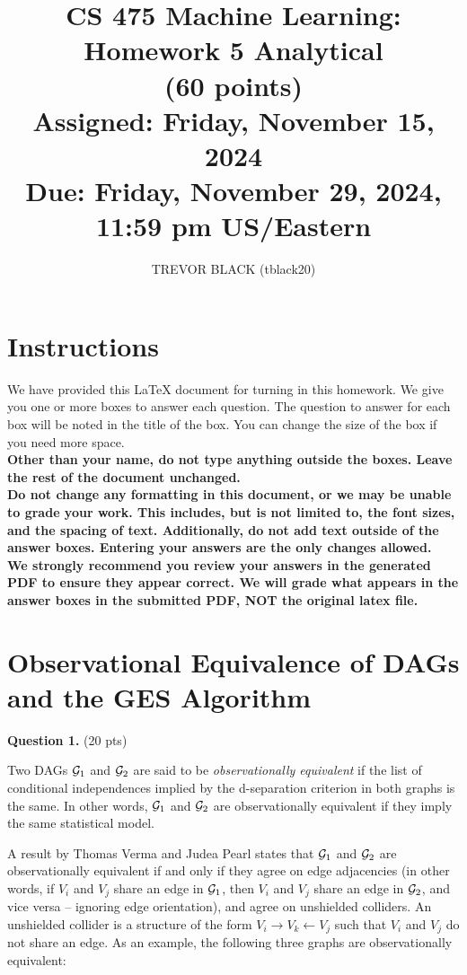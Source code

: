 \documentclass[11pt]{article}
\title{CS 475 Machine Learning: Homework 5 Analytical \\
(60 points)\\
\Large{Assigned: Friday, November 15, 2024} \\
\Large{Due: Friday, November 29, 2024, 11:59 pm US/Eastern}}
\author{TREVOR BLACK (tblack20)}
\date{}
\begin{document}
\maketitle
\thispagestyle{headings}

\section*{Instructions }
We have provided this \LaTeX{} document for turning in this homework. We give you one or more boxes to answer each question.  The question to answer for each box will be noted in the title of the box.  You can change the size of the box if you need more space.\\

{\bf Other than your name, do not type anything outside the boxes. Leave the rest of the document unchanged.}\\


\textbf{Do not change any formatting in this document, or we may be unable to
  grade your work. This includes, but is not limited to, the font sizes, and the spacing of text.  Additionally, do
  not add text outside of the answer boxes. Entering your answers are the only
  changes allowed.}\\


\textbf{We strongly recommend you review your answers in the generated PDF to
  ensure they appear correct. We will grade what appears in the answer boxes in
  the submitted PDF, NOT the original latex file.}

\pagebreak

\section*{Observational Equivalence of DAGs and the GES Algorithm}

{\bf Question 1.} (20 pts)

Two DAGs ${\cal G}_1$ and ${\cal G}_2$ are said to be \emph{observationally equivalent} if the list of conditional independences implied by the d-separation criterion in both graphs is the same.  In other words, ${\cal G}_1$ and ${\cal G}_2$ are observationally equivalent if they imply the same statistical model.

A result by Thomas Verma and Judea Pearl states that ${\cal G}_1$ and ${\cal G}_2$ are observationally equivalent if and only if they agree on edge adjacencies (in other words, if $V_i$ and $V_j$ share an edge in ${\cal G}_1$, then $V_i$ and $V_j$ share an edge in ${\cal G}_2$, and vice versa -- ignoring edge orientation), and agree on unshielded colliders.  An unshielded collider is a structure of the form $V_i \to V_k \gets V_j$ such that $V_i$ and $V_j$ do not share an edge.  As an example, the following three graphs are observationally equivalent:
\end{document}
